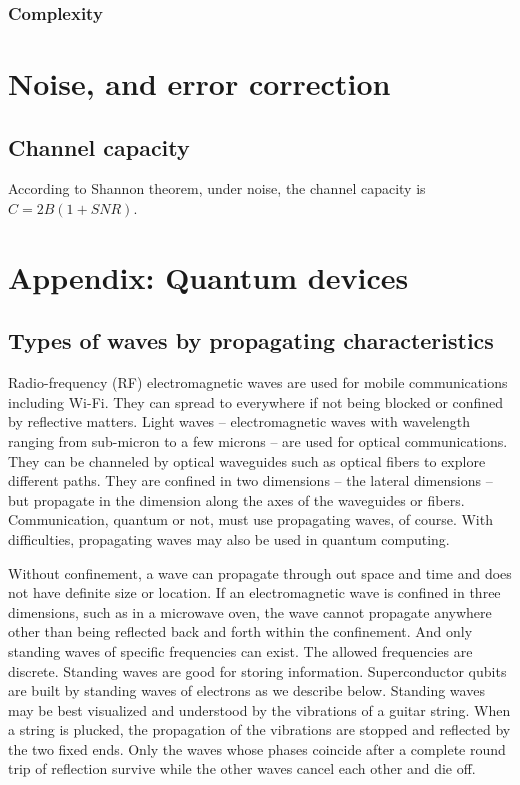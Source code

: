 \documentclass[Letter,11pt]{book}
\begin{document}
\subsection{Complexity}

\chapter{Noise, and error correction}
\section{Channel capacity}
According to Shannon theorem, under noise, the channel capacity is $C = 2B (1+SNR)$.


\chapter*{Appendix: Quantum devices}\label{A-qubit}
\section{Types of waves by propagating characteristics}
Radio-frequency (RF) electromagnetic waves are used for mobile communications including Wi-Fi. They can spread to everywhere if not being blocked or confined by reflective matters. Light waves -- electromagnetic waves with wavelength ranging from sub-micron to a few microns -- are used for optical communications. They can be channeled by optical waveguides such as optical fibers to explore different paths. They are confined in two dimensions -- the lateral dimensions -- but propagate in the dimension along the axes of the waveguides or fibers. Communication, quantum or not, must use propagating waves, of course. With difficulties, propagating waves may also be used in quantum computing.

Without confinement, a wave can propagate through out space and time and does not have definite size or location. If an electromagnetic wave is confined in three dimensions, such as in a microwave oven, the wave cannot propagate anywhere other than being reflected back and forth within the confinement. And only standing waves of specific frequencies can exist. The allowed frequencies are discrete. Standing waves are good for storing information. Superconductor qubits are built by standing waves of electrons as we describe below. Standing waves may be best visualized and understood by the vibrations of a guitar string. When a string is plucked, the propagation of the vibrations are stopped and reflected by the two fixed ends. Only the waves whose phases coincide after a complete round trip of reflection survive while the other waves cancel each other and die off.
\end{document}
